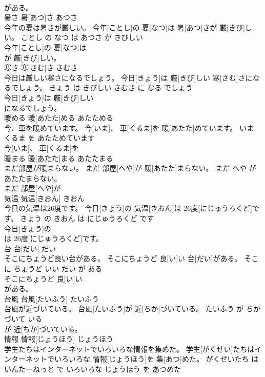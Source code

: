 \documentclass[8pt]{extreport}
\begin{document}
\begin{CJK}{UTF8}{min}
\\	がある。			
\\	暑さ	暑[あつ]さ	あつさ	
\\	今年の夏は暑さが厳しい。	今年[ことし]の 夏[なつ]は 暑[あつ]さが 厳[きび]しい。	ことし の なつ は あつさ が きびしい	
\\	今年[ことし]の 夏[なつ]は
\\	が 厳[きび]しい。			
\\	寒さ	寒[さむ]さ	さむさ	
\\	今日は厳しい寒さになるでしょう。	今日[きょう]は 厳[きび]しい 寒[さむ]さになるでしょう。	きょう は きびしい さむさ に なる でしょう	
\\	今日[きょう]は 厳[きび]しい
\\	になるでしょう。			
\\	暖める	暖[あたた]める	あたためる	
\\	今、車を暖めています。	今[いま]、 車[くるま]を 暖[あたた]めています。	いま くるま を あたためています	
\\	今[いま]、 車[くるま]を
\\	暖まる	暖[あたた]まる	あたたまる	
\\	まだ部屋が暖まらない。	まだ 部屋[へや]が 暖[あたた]まらない。	まだ へや が あたたまらない。	
\\	まだ 部屋[へや]が
\\	気温	気温[きおん]	きおん	
\\	今日の気温は26度です。	今日[きょう]の 気温[きおん]は 26度[にじゅうろくど]です。	きょう の きおん は にじゅうろくど です	
\\	今日[きょう]の
\\	は 26度[にじゅうろくど]です。			
\\	台	台[だい]	だい	
\\	そこにちょうど良い台がある。	そこにちょうど 良[い]い 台[だい]がある。	そこ に ちょうど いい だい が ある	
\\	そこにちょうど 良[い]い
\\	がある。			
\\	台風	台風[たいふう]	たいふう	
\\	台風が近づいている。	台風[たいふう]が 近[ちか]づいている。	たいふう が ちかづいて いる	
\\	が 近[ちか]づいている。			
\\	情報	情報[じょうほう]	じょうほう	
\\	学生たちはインターネットでいろいろな情報を集めた。	学生[がくせい]たちはインターネットでいろいろな 情報[じょうほう]を 集[あつ]めた。	がくせいたち は いんたーねっと で いろいろな じょうほう を あつめた	

\end{CJK}
\end{document}
